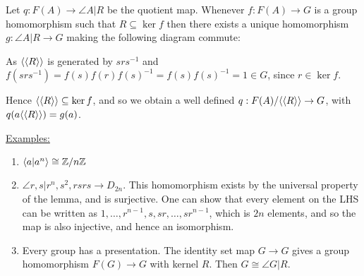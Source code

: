 \documentclass[10pt,a4paper]{article}
\begin{document}
\begin{lemma}
Let $q:F(A) \to \angle{A|R}$ be the quotient map. Whenever $f:F(A) \to G$ is a group homomorphism such that $R \subseteq \ker f$ then there exists a unique homomorphism $g : \angle{A|R} \to G$ making the following diagram commute:
\begin{center}
\end{center}
\end{lemma}
\begin{proposition}
As $\langle \langle R \rangle \rangle$ is generated by $srs^{-1}$ and $f(srs^{-1}) = f(s)f(r)f(s)^{-1} = f(s)f(s)^{-1} = 1 \in G$, since $r \in \ker f$.

Hence $\langle \langle R \rangle \rangle \subseteq \ker f$, and so we obtain a well defined $q : F(A)/\langle \langle R \rangle \rangle \to G$, with $q(a \langle \langle R \rangle \rangle) = g(a)$.
\end{proposition}

\underline{Examples:}
\begin{enumerate}
\item $\langle a|a^n \rangle \cong \mathbb{Z}/n\mathbb{Z}$
\item $\angle{r,s | r^n, s^2, rsrs} \to D_{2n}$. This homomorphism exists by the universal property of the lemma, and is surjective. One can show that every element on the LHS can be written as $1, \ldots, r^{n-1}, s, sr, \ldots, sr^{n-1}$, which is $2n$ elements, and so the map is also injective, and hence an isomorphism.
\item Every group has a presentation. The identity set map $G \to G$ gives a group homomorphism $F(G) \to G$ with kernel $R$. Then $G \cong \angle{G|R}$.
\end{enumerate}
\end{document}

